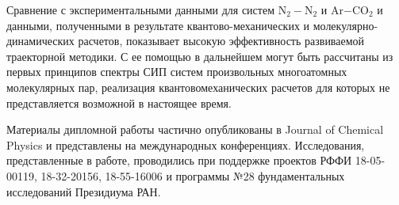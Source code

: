 \documentclass[12pt]{article}
\begin{document}
Сравнение с экспериментальными данными для систем N$_2-$N$_2$ и Ar$-$CO$_2$ и данными, полученными в результате кван\-тово-механических и молекулярно-динамических расчетов, показывает высокую эффективность развиваемой траекторной методики. С ее помощью в дальнейшем могут быть рассчитаны из первых принципов спектры СИП систем произвольных многоатомных молекулярных пар, реализация квантовомеханических расчетов для которых не представляется возможной в настоящее время. \par
Материалы дипломной работы частично опубликованы в Journal of Chemical Physics и представлены на международных конференциях. Исследования, представленные в работе, проводились при поддержке проектов РФФИ 18-05-00119, 18-32-20156, 18-55-16006 и программы №28 фундаментальных исследований Президиума РАН.
\end{document}
